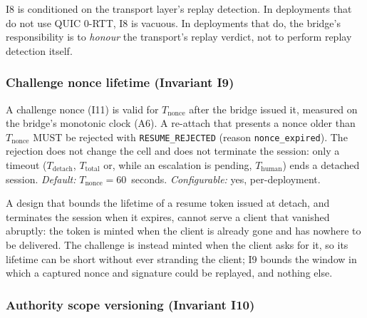 I8 is conditioned on the transport layer's replay detection. In
deployments that do not use QUIC 0-RTT, I8 is vacuous. In deployments
that do, the bridge's responsibility is to \emph{honour} the
transport's replay verdict, not to perform replay detection itself.

\subsubsection{Challenge nonce lifetime (Invariant I9)}
\label{sec:invariants-ttl}

\begin{invariant}\label{inv:I9}
A challenge nonce (I11) is valid for $T_{\text{nonce}}$ after the bridge
issued it, measured on the bridge's monotonic clock (A6). A re-attach
that presents a nonce older than $T_{\text{nonce}}$ MUST be rejected
with \texttt{RESUME\_REJECTED} (reason \texttt{nonce\_expired}). The
rejection does not change the cell and does not terminate the session:
only a timeout ($T_{\text{detach}}$, $T_{\text{total}}$ or, while an
escalation is pending, $T_{\text{human}}$) ends a detached session. \emph{Default:}
$T_{\text{nonce}} = 60$~seconds. \emph{Configurable:} yes,
per-deployment.
\end{invariant}

A design that bounds the lifetime of a resume token issued at detach,
and terminates the session when it expires, cannot serve a client that vanished abruptly: the token is minted when
the client is already gone and has nowhere to be delivered. The
challenge is instead minted when the client asks for it, so its
lifetime can be short without ever stranding the client; I9 bounds the
window in which a captured nonce and signature could be replayed, and
nothing else.

\subsubsection{Authority scope versioning (Invariant I10)}
\label{sec:invariants-scope-version}

